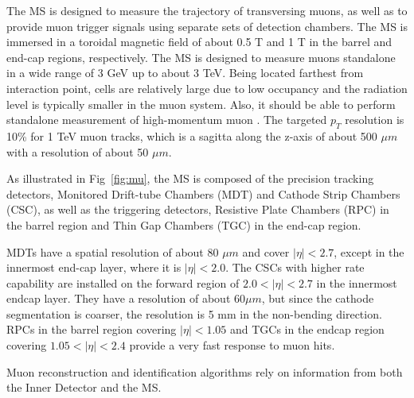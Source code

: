 \par The MS \cite{CERN-LHCC-97-022} is designed to measure the trajectory of transversing muons, as well as to provide muon trigger signals using separate sets of detection chambers. The MS is immersed in a toroidal magnetic field of about 0.5 T and 1 T in the barrel and end-cap regions, respectively. The MS is designed to measure muons standalone in a wide range of 3 GeV up to about 3 TeV. 
Being located farthest from interaction point, cells are relatively large due to low occupancy and the radiation level is typically 
smaller in the muon system. 
Also, it should be able to perform standalone measurement of high-momentum muon \cite{muon}.
The targeted $p_T$ resolution is 10\% for 1 TeV muon tracks, which is a sagitta along the z-axis of about 500 $\mu m$ with a resolution of about 50 $\mu m$.
\par As illustrated in Fig~\ref{fig:mu}, the MS is composed of the precision tracking detectors, Monitored Drift-tube Chambers (MDT) and Cathode Strip Chambers (CSC), as well as the triggering detectors, Resistive Plate Chambers (RPC) in the barrel region and Thin Gap Chambers (TGC) in the end-cap region.
\par MDTs have a spatial resolution of about 80 $\mu m$ and cover $|\eta| < 2.7$, except in the innermost end-cap layer, where it is $|\eta| < 2.0$. The CSCs with higher rate capability are installed on the forward region of $2.0 < |\eta| < 2.7$ in the innermost endcap layer. They have a resolution of about 60$\mu m$, but since the cathode segmentation is coarser, the resolution is 5 mm in the non-bending direction. RPCs in the barrel region covering $|\eta| < 1.05$ and TGCs in the endcap region covering $1.05 < |\eta| < 2.4$ provide a very fast response to muon hits.
\par Muon reconstruction and identification algorithms rely on information from both the Inner Detector and the MS.

